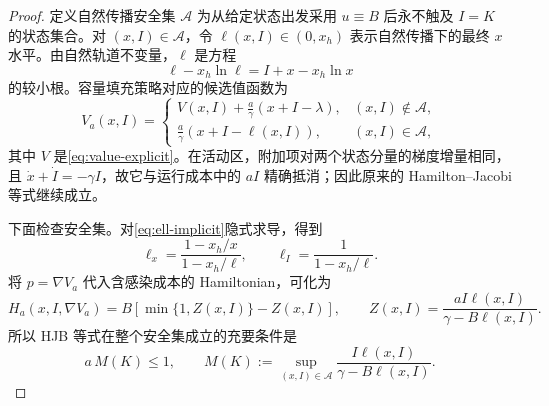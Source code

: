 \documentclass[11pt,a4paper,UTF8]{ctexart}
\theoremstyle{definition}
\begin{document}
\begin{proof}
定义自然传播安全集 $\mathcal A$ 为从给定状态出发采用 $u\equiv B$ 后永不触及 $I=K$ 的状态集合。对 $(x,I)\in\mathcal A$，令 $\ell(x,I)\in(0,x_h)$ 表示自然传播下的最终 $x$ 水平。由自然轨道不变量，$\ell$ 是方程
\begin{equation}
\ell-x_h\ln\ell=I+x-x_h\ln x
\label{eq:ell-implicit}
\end{equation}
的较小根。容量填充策略对应的候选值函数为
\begin{equation}
V_a(x,I)=
\begin{cases}
\displaystyle V(x,I)+\frac a\gamma(x+I-\lambda), &(x,I)\notin\mathcal A,\\[2mm]
\displaystyle \frac a\gamma(x+I-\ell(x,I)), &(x,I)\in\mathcal A,
\end{cases}
\label{eq:Va-candidate}
\end{equation}
其中 $V$ 是\eqref{eq:value-explicit}。在活动区，附加项对两个状态分量的梯度增量相同，且
$\dot x+\dot I=-\gamma I$，故它与运行成本中的 $aI$ 精确抵消；因此原来的 Hamilton--Jacobi 等式继续成立。

下面检查安全集。对\eqref{eq:ell-implicit}隐式求导，得到
\begin{equation}
\ell_x=\frac{1-x_h/x}{1-x_h/\ell},
\qquad
\ell_I=\frac{1}{1-x_h/\ell}.
\label{eq:ell-gradient}
\end{equation}
将 $p=\nabla V_a$ 代入含感染成本的 Hamiltonian，可化为
\begin{equation}
H_a(x,I,\nabla V_a)
=B\left[\min\{1,Z(x,I)\}-Z(x,I)\right],
\qquad
Z(x,I)=\frac{aI\ell(x,I)}{\gamma-B\ell(x,I)}.
\label{eq:Ha-safe}
\end{equation}
所以 HJB 等式在整个安全集成立的充要条件是
\begin{equation}
a\,M(K)\le1,
\qquad
M(K):=\sup_{(x,I)\in\mathcal A}
\frac{I\ell(x,I)}{\gamma-B\ell(x,I)}.
\label{eq:M-condition}
\end{equation}


\end{proof}
\end{document}
